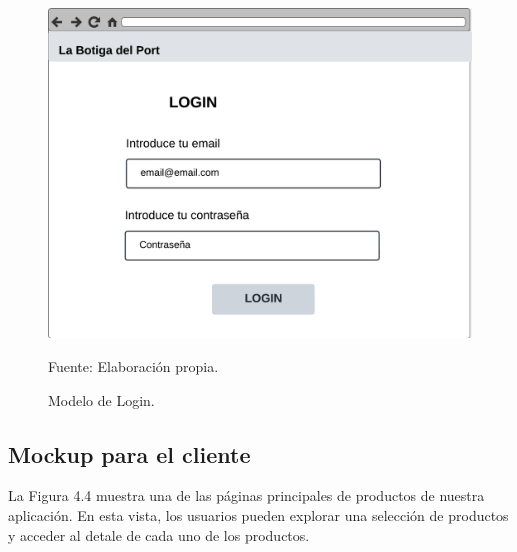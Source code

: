 \begin{figure}[H]
\begin{center}
\includegraphics[scale=0.5]{./Images/login.png}
\caption{Modelo de Login.} Fuente: Elaboración propia.

\label{fig:fig3}

\end{center}
\end{figure}

\subsection{Mockup para el cliente}\label{subsec4.2.2}

La Figura 4.4 muestra una de las páginas principales de productos de nuestra aplicación. En esta vista, los usuarios pueden explorar una selección de productos y acceder al detale de cada uno de los productos. 

